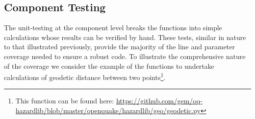 \subsection{Component Testing}
The unit-testing at the component level breaks the functions into simple
calculations whose results can be verified by hand. 
These tests, similar in nature to that illustrated previously, provide 
the majority of the line and parameter coverage needed to ensure a 
robust code. To illustrate the comprehensive nature of the coverage 
we consider the example of the functions to undertake calculations of
geodetic distance between two points\footnote{This function can be found here: 
\href{https://github.com/gem/oq-hazardlib/blob/master/openquake/hazardlib/geo/geodetic.py}{https://github.com/gem/oq-hazardlib/blob/master/openquake/hazardlib/geo/geodetic.py}}. 

